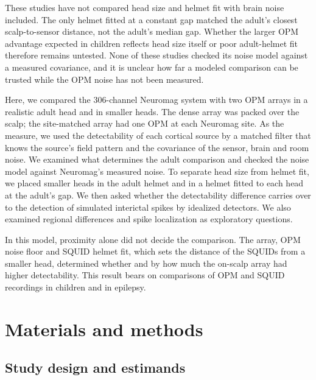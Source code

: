 \documentclass[preprint,12pt,authoryear,a4paper]{elsarticle}
\begin{document}
These studies have not compared head size and helmet fit with brain noise included. The only helmet fitted at a constant gap \citep{zahran2022} matched the adult's closest scalp-to-sensor distance, not the adult's median gap. Whether the larger OPM advantage expected in children reflects head size itself or poor adult-helmet fit therefore remains untested. None of these studies checked its noise model against a measured covariance, and it is unclear how far a modeled comparison can be trusted while the OPM noise has not been measured.

Here, we compared the 306-channel Neuromag system with two OPM arrays in a realistic adult head and in smaller heads. The dense array was packed over the scalp; the site-matched array had one OPM at each Neuromag site. As the measure, we used the detectability of each cortical source by a matched filter that knows the source's field pattern and the covariance of the sensor, brain and room noise. We examined what determines the adult comparison and checked the noise model against Neuromag's measured noise. To separate head size from helmet fit, we placed smaller heads in the adult helmet and in a helmet fitted to each head at the adult's gap. We then asked whether the detectability difference carries over to the detection of simulated interictal spikes by idealized detectors. We also examined regional differences and spike localization as exploratory questions.

In this model, proximity alone did not decide the comparison. The array, OPM noise floor and SQUID helmet fit, which sets the distance of the SQUIDs from a smaller head, determined whether and by how much the on-scalp array had higher detectability. This result bears on comparisons of OPM and SQUID recordings in children and in epilepsy.


\section{Materials and methods}\label{sec:methods}

\subsection{Study design and estimands}\label{sec:design}
\end{document}
